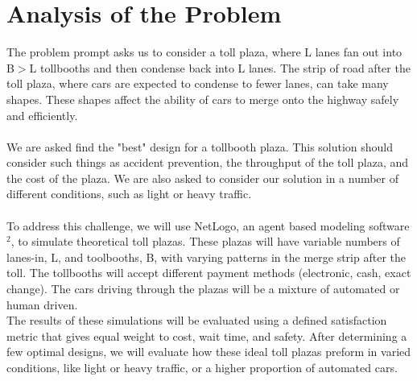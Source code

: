 \documentclass{article}
\begin{document}
\section{Analysis of the Problem}
The problem prompt asks us to consider a toll plaza, where L lanes fan out into B$>$L tollbooths and then condense back into L lanes. The strip of road after the toll plaza, where cars are expected to condense to fewer lanes, can take many shapes. These shapes affect the ability of cars to merge onto the highway safely and efficiently. \\ \\ 
We are asked find the "best" design for a tollbooth plaza. This solution should consider such things as accident prevention, the throughput of the toll plaza, and the cost of the plaza. We are also asked to consider our solution in a number of different conditions, such as light or heavy traffic. \\ \\
To address this challenge, we will use NetLogo, an agent based modeling software$^{\text{2}}$, to simulate theoretical toll plazas. These plazas will have variable numbers of lanes-in, L, and toolbooths, B, with varying patterns in the merge strip after the toll. The tollbooths will accept different payment methods (electronic, cash, exact change). The cars driving through the plazas will be a mixture of automated or human driven. \\
The results of these simulations will be evaluated using a defined satisfaction metric that gives equal weight to cost, wait time, and safety. After determining a few optimal designs, we will evaluate how these ideal toll plazas preform in varied conditions, like light or heavy traffic, or a higher proportion of automated cars.\\

\end{document}
